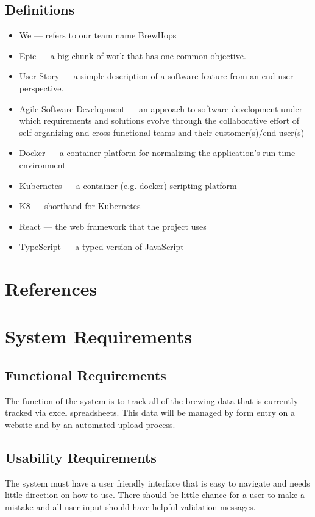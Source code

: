 \documentclass[draftclsnofoot,onecolumn,journal,letterpaper,compsoc,10pt]{IEEEtran}
\begin{document}
    \subsection{Definitions}
    \begin{itemize}
        \item We --- refers to our team name BrewHops
        \item Epic --- a big chunk of work that has one common objective.
        \item User Story --- a simple description of a software feature from an end-user perspective.
        \item Agile Software Development --- an approach to software development under which requirements and solutions evolve through the collaborative effort of self-organizing and cross-functional teams and their customer(s)/end user(s)
        \item Docker --- a container platform for normalizing the application's run-time environment \cite{docker}
        \item Kubernetes --- a container (e.g. docker) scripting platform \cite{kubernetes}
        \item K8 --- shorthand for Kubernetes
        \item React --- the web framework that the project uses \cite{react}
        \item TypeScript --- a typed version of JavaScript \cite{typescript}
    \end{itemize}

\section{References}



\section{System Requirements}
    \subsection{Functional Requirements}
    The function of the system is to track all of the brewing data that is currently tracked via excel spreadsheets. This data will be managed by form entry on a website and by an automated upload process.
    \subsection{Usability Requirements}
    The system must have a user friendly interface that is easy to navigate and needs little direction on how to use. There should be little chance for a user to make a mistake and all user input should have helpful validation messages.
\end{document}
